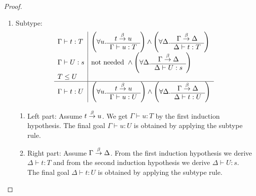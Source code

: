 \begin{theorem}
{\begin{proof}
\begin{enumerate}
\begin{enumerate}
\begin{enumerate}
\begin{enumerate}
                        \item
                            $\Delta = (\Gamma, x^B)
                            \land A \reduce B$:

                            In that case we get $\Gamma \vdash B : s$ from the
                                second induction hypothesis which implies the
                                final goal $\Gamma, x^B \vdash t : T$ by
                                application of the weakening rule.
                    \end{enumerate}
                \end{enumerate}


                \item Subtype:
                $$
                \begin{array}{l|l}
                    \Gamma \vdash t : T
                    &
                    \left( \forall u. \begin{array}{c} t \stackrel{\beta}{\to} u \\ \hline \Gamma \vdash u: T\end{array} \right)
                    \land
                    \left( \forall \Delta. \begin{array}{c} \Gamma \stackrel{\beta}{\to} \Delta \\ \hline \Delta \vdash t: T\end{array} \right)
                    \\
                    \Gamma \vdash U : s
                    &
                    \text{not needed }
                    \land
                    \left( \forall \Delta. \begin{array}{c} \Gamma \stackrel{\beta}{\to} \Delta \\ \hline \Delta \vdash U: s\end{array} \right)
                    \\
                    T \le U
                    \\
                    \hline
                    \Gamma \vdash t : U
                    &
                    \left( \forall u. \begin{array}{c} t \stackrel{\beta}{\to} u \\ \hline \Gamma \vdash u: U\end{array} \right)
                    \land
                    \left( \forall \Delta. \begin{array}{c} \Gamma \stackrel{\beta}{\to} \Delta \\ \hline \Delta \vdash t: U\end{array} \right)
                \end{array}
                $$
                \begin{enumerate}
                    \item Left part: Assume $t \stackrel{\beta}{\to} u$. We get $\Gamma \vdash
                        u: T$ by the first induction hypothesis. The final goal
                        $\Gamma \vdash u: U$ is obtained by applying the subtype
                        rule.

                    \item Right part: Assume $\Gamma \stackrel{\beta}{\to} \Delta$. From the
                        first induction hypothesis we derive $\Delta \vdash t :
                        T$ and from the second induction hypothesis we derive
                        $\Delta \vdash U : s$. The final goal $\Delta \vdash t:
                        U$ is obtained by applying the subtype rule.
                \end{enumerate}
            \end{enumerate}
        \end{enumerate}
    \end{proof}
    }
\end{theorem}





